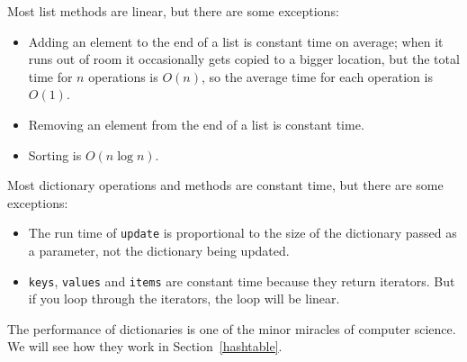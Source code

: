 \documentclass[10pt]{book}
\begin{document}
Most list methods are linear, but there are some exceptions:

\begin{itemize}

\item Adding an element to the end of a list is constant time on
average; when it runs out of room it occasionally gets copied
to a bigger location, but the total time for $n$ operations
is $O(n)$, so the average time for each
operation is $O(1)$.

\item Removing an element from the end of a list is constant time.

\item Sorting is $O(n \log n)$.

\end{itemize}

Most dictionary operations and methods are constant time, but
there are some exceptions:

\begin{itemize}

\item The run time of {\tt update} is
  proportional to the size of the dictionary passed as a parameter,
  not the dictionary being updated.

\item {\tt keys}, {\tt values} and {\tt items} are constant time because 
  they return iterators.  But
  if you loop through the iterators, the loop will be linear.

\end{itemize}

The performance of dictionaries is one of the minor miracles of
computer science.  We will see how they work in
Section~\ref{hashtable}.
\end{document}
